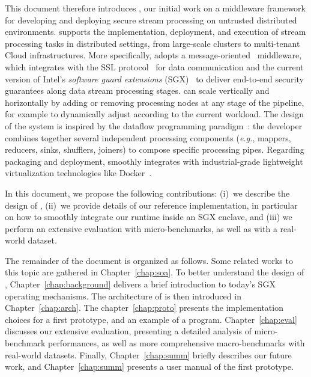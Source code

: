 This document therefore introduces \SS{}, our initial work on a middleware framework for developing and deploying secure stream processing on untrusted distributed environments.
\SS{} supports the implementation, deployment, and execution of stream processing tasks in distributed settings, from large-scale clusters to multi-tenant Cloud infrastructures.
More specifically, \SS{} adopts a message-oriented~\cite{mom} middleware, which integrates with the SSL protocol~\cite{freier2011secure} for data communication and the current version of Intel{\textregistered}'s \emph{software guard extensions} (SGX)~\cite{costan_intel} to deliver end-to-end security guarantees along data stream processing stages.
\SS{} can scale vertically and horizontally by adding or removing processing nodes at any stage of the pipeline, for example to dynamically adjust according to the current workload.
The design of the \SS{} system is inspired by the dataflow programming paradigm~\cite{uustalu_essence_2005}: the developer combines together several independent processing components (\textit{e.g.}, mappers, reducers, sinks, shufflers, joiners) to compose specific processing pipes.
Regarding packaging and deployment, \SS{} smoothly integrates with industrial-grade lightweight virtualization technologies like Docker~\cite{docker}.

In this document, we propose the following contributions: (i)~we describe the design of \SS, (ii)~we provide details of our reference implementation, in particular on how to smoothly integrate our runtime inside an SGX enclave, and (iii) we perform an extensive evaluation with micro-benchmarks, as well as with a real-world dataset.

The remainder of the document is organized as follows.
Some related works to this topic are gathered in Chapter~\ref{chap:soa}.
To better understand the design of \SS, Chapter~\ref{chap:background} delivers a brief introduction to today's SGX operating mechanisms.
The architecture of \SS{} is then introduced in Chapter~\ref{chap:arch}.
The chapter~\ref{chap:proto} presents the implementation choices for a first prototype, and an example of a \SS{} program.
Chapter~\ref{chap:eval} discusses our extensive evaluation, presenting a detailed analysis of micro-benchmark performances, as well as more comprehensive macro-benchmarks with real-world datasets.
Finally, Chapter~\ref{chap:summ} briefly describes our future work, and Chapter~\ref{chap:summ} presents a user manual of the first \SS{} prototype.
